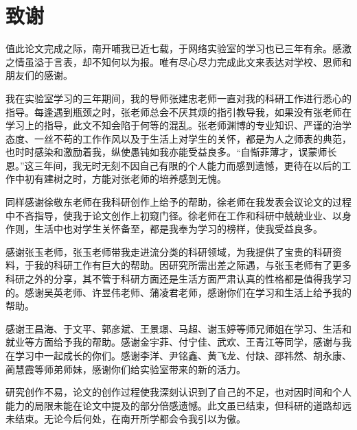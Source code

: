 
\chapter*{致谢}

值此论文完成之际，南开哺我已近七载，于网络实验室的学习也已三年有余。感激之情虽溢于言表，却不知何以为报。唯有尽心尽力完成此文来表达对学校、恩师和朋友们的感谢。

我在实验室学习的三年期间，我的导师张建忠老师一直对我的科研工作进行悉心的指导。每逢遇到瓶颈之时，张老师总会不厌其烦的指引教导我，如果没有张老师在学习上的指导，此文不知会陷于何等的混乱。张老师渊博的专业知识、严谨的治学态度、一丝不苟的工作作风以及于生活上对学生的关怀，都是为人之师表的典范，也时时感染和激励着我，纵使愚钝如我亦能受益良多。“自惭菲薄才，误蒙师长恩。”这三年间，我无时无刻不因自己有限的个人能力而感到遗憾，更待在以后的工作中初有建树之时，方能对张老师的培养感到无愧。

同样感谢徐敬东老师在我科研创作上给予的帮助，徐老师在我发表会议论文的过程中不吝指导，使我于论文创作上初窥门径。徐老师在工作和科研中兢兢业业、以身作则，生活中也对学生关怀备至，都是我奉为学习的榜样，使我受益良多。

感谢张玉老师，张玉老师带我走进流分类的科研领域，为我提供了宝贵的科研资料，于我的科研工作有巨大的帮助。因研究所需出差之际遇，与张玉老师有了更多科研之外的分享，其不管于科研方面还是生活方面严肃认真的性格都是值得我学习的。感谢吴英老师、许昱伟老师、蒲凌君老师，感谢你们在学习和生活上给予我的帮助。

感谢王昌海、于文平、郭彦斌、王景璟、马超、谢玉婷等师兄师姐在学习、生活和就业等方面给予我的帮助。感谢金宇菲、付宁佳、武欢、王青江等同学，感谢与我在学习中一起成长的你们。感谢李洋、尹铭鑫、黄飞龙、付缺、邵祎然、胡永康、蔺慧霞等师弟师妹，感谢你们给实验室带来的新的活力。

研究创作不易，论文的创作过程使我深刻认识到了自己的不足，也对因时间和个人能力的局限未能在论文中提及的部分倍感遗憾。此文虽已结束，但科研的道路却远未结束。无论今后何处，在南开所学都会令我引以为傲。